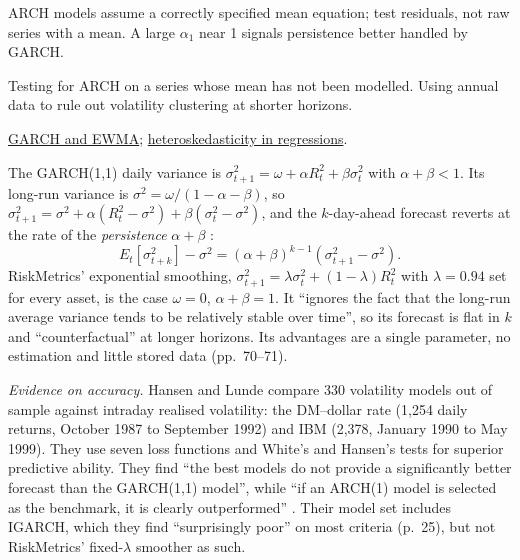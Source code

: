 \begin{qfmodel}
 ARCH models assume a correctly specified mean equation; test residuals, not raw series with a mean. A large $\alpha_1$ near 1 signals persistence better handled by GARCH.

 Testing for ARCH on a series whose mean has not been modelled. Using annual data to rule out volatility clustering at shorter horizons.

 \hyperref[mod:garch-volatility-forecast]{GARCH and EWMA}; \hyperref[meth:regression-misspecification]{heteroskedasticity in regressions}.

\end{qfmodel}

\begin{qfmodel}\label{mod:garch-volatility-forecast}
 The GARCH(1,1) daily variance is $\sigma^2_{t+1}=\omega+\alpha R_t^2+\beta\sigma_t^2$ with $\alpha+\beta<1$. Its long-run variance is $\sigma^2=\omega/(1-\alpha-\beta)$, so $\sigma^2_{t+1}=\sigma^2+\alpha(R_t^2-\sigma^2)+\beta(\sigma_t^2-\sigma^2)$, and the $k$-day-ahead forecast reverts at the rate of the \emph{persistence} $\alpha+\beta$ \citep[chap.~4, secs.~2--3, printed pp.~70--71 of an uncorrected proof]{wide-christoffersen-elements}:
\[ E_t[\sigma^2_{t+k}]-\sigma^2=(\alpha+\beta)^{k-1}(\sigma^2_{t+1}-\sigma^2). \]
RiskMetrics' exponential smoothing, $\sigma^2_{t+1}=\lambda\sigma^2_t+(1-\lambda)R_t^2$ with $\lambda=0.94$ set for every asset, is the case $\omega=0$, $\alpha+\beta=1$. It ``ignores the fact that the long-run average variance tends to be relatively stable over time'', so its forecast is flat in $k$ and ``counterfactual'' at longer horizons. Its advantages are a single parameter, no estimation and little stored data (pp.~70--71).

\emph{Evidence on accuracy.} Hansen and Lunde compare 330 volatility models out of sample against intraday realised volatility: the DM--dollar rate (1,254 daily returns, October 1987 to September 1992) and IBM (2,378, January 1990 to May 1999). They use seven loss functions and White's and Hansen's tests for superior predictive ability. They find ``the best models do not provide a significantly better forecast than the GARCH(1,1) model'', while ``if an ARCH(1) model is selected as the benchmark, it is clearly outperformed'' \citep[abstract; sec.~2.4, pp.~7--8; sec.~6]{hansen-lunde-2001}. Their model set includes IGARCH, which they find ``surprisingly poor'' on most criteria (p.~25), but not RiskMetrics' fixed-$\lambda$ smoother as such.


\end{qfmodel}
